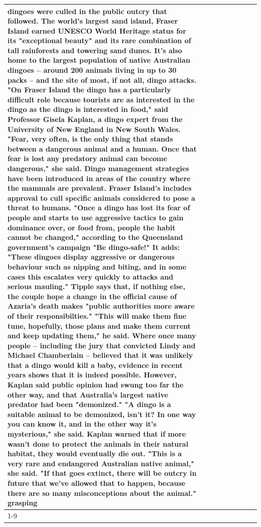 \begin{table}[H]
\begin{tabular}{lllrlllll}
dingoes were culled in the public outcry that followed. The world's largest sand island, Fraser Island earned UNESCO World Heritage status for its "exceptional beauty" and its rare combination of tall rainforests and towering sand dunes. It's also home to the largest population of native Australian dingoes -- around 200 animals living in up to 30 packs -- and the site of most, if not all, dingo attacks. "On Fraser Island the dingo has a particularly difficult role because tourists are as interested in the dingo as the dingo is interested in food," said Professor Gisela Kaplan, a dingo expert from the University of New England in New South Wales. "Fear, very often, is the only thing that stands between a dangerous animal and a human. Once that fear is lost any predatory animal can become dangerous," she said. Dingo management strategies have been introduced in areas of the country where the mammals are prevalent. Fraser Island's includes approval to cull specific animals considered to pose a threat to humans. "Once a dingo has lost its fear of people and starts to use aggressive tactics to gain dominance over, or food from, people the habit cannot be changed," according to the Queensland government's campaign "Be dingo-safe!" It adds: "These dingoes display aggressive or dangerous behaviour such as nipping and biting, and in some cases this escalates very quickly to attacks and serious mauling." Tipple says that, if nothing else, the couple hope a change in the official cause of Azaria's death makes "public authorities more aware of their responsibilties." "This will make them fine tune, hopefully, those plans and make them current and keep updating them," he said. Where once many people -- including the jury that convicted Lindy and Michael Chamberlain -- believed that it was unlikely that a dingo would kill a baby, evidence in recent years shows that it is indeed possible. However, Kaplan said public opinion had swung too far the other way, and that Australia's largest native predator had been "demonized." "A dingo is a suitable animal to be demonized, isn't it? In one way you can know it, and in the other way it's mysterious," she said. Kaplan warned that if more wasn't done to protect the animals in their natural habitat, they would eventually die out. "This is a very rare and endangered Australian native animal," she said. "If that goes extinct, there will be outcry in future that we've allowed that to happen, because there are so many misconceptions about the animal." grasping \\
\cline{1-9}

\end{tabular}
\end{table}
